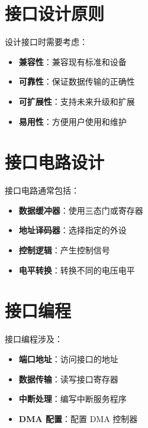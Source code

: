 \documentclass[12pt,UTF8]{ctexbook}
\begin{document}
\section{接口设计原则}

设计接口时需要考虑：

\begin{itemize}[leftmargin=2cm]
    \item \textbf{兼容性}：兼容现有标准和设备
    \item \textbf{可靠性}：保证数据传输的正确性
    \item \textbf{可扩展性}：支持未来升级和扩展
    \item \textbf{易用性}：方便用户使用和维护
\end{itemize}

\section{接口电路设计}

接口电路通常包括：

\begin{itemize}[leftmargin=2cm]
    \item \textbf{数据缓冲器}：使用三态门或寄存器
    \item \textbf{地址译码器}：选择指定的外设
    \item \textbf{控制逻辑}：产生控制信号
    \item \textbf{电平转换}：转换不同的电压电平
\end{itemize}

\section{接口编程}

接口编程涉及：

\begin{itemize}[leftmargin=2cm]
    \item \textbf{端口地址}：访问接口的地址
    \item \textbf{数据传输}：读写接口寄存器
    \item \textbf{中断处理}：编写中断服务程序
    \item \textbf{DMA 配置}：配置 DMA 控制器
\end{itemize}

\backmatter
\end{document}
